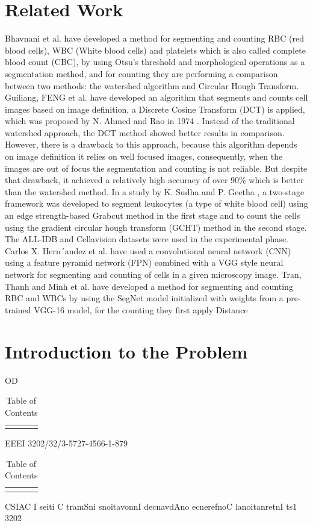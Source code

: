\documentclass[conference]{IEEEtran}
\begin{document}
\section{Related Work}
Bhavnani et al. \cite{ref2} have developed a method for segmenting and counting RBC (red blood cells), WBC (White blood cells) and platelets which is also called complete blood count (CBC), by using Otsu’s threshold and morphological operations as a segmentation method, and for counting they are performing a comparison between two methods: the watershed algorithm and Circular Hough Transform.
Guiliang, FENG et al. \cite{ref3} have developed an algorithm that segments and counts cell images based on image definition, a Discrete Cosine Transform (DCT) is applied, which was proposed by N. Ahmed and Rao in 1974 \cite{ref4}. Instead of the traditional watershed approach, the DCT method showed better results in comparison. However, there is a drawback to this approach, because this algorithm depends on image definition it relies on well focused images, consequently, when the images are out of focus the segmentation and counting is not reliable. But despite that drawback, it achieved a relatively high accuracy of over 90\% which is better than the watershed method. In a study by K. Sudha and P. Geetha \cite{ref5}, a two-stage framework was developed to segment leukocytes (a type of white blood cell) using an edge strength-based Grabcut method in the first stage and to count the cells using the gradient circular hough transform (GCHT) method in the second stage. The ALL-IDB \cite{ref6} and Cellavision \cite{ref7} datasets were used in the experimental phase.
Carlos X. Hern´andez et al. \cite{ref8} have used a convolutional neural network (CNN) using a feature pyramid network (FPN) combined with a VGG style neural network for segmenting and counting of cells in a given microscopy image.
Tran, Thanh and Minh et al. \cite{ref9} have developed a method for segmenting and counting RBC and WBCs by using the SegNet model initialized with weights from a pre-trained VGG-16 model, for the counting they first apply Distance

\section{Introduction to the Problem}
OD
\begin{table}[htbp]
\centering
\caption{Table of Contents}
\label{tab:label}
\begin{tabular}{lll}
\hline
 & & \\
\hline
 & & \\
\hline
\end{tabular}
\end{table}
EEEI
3202/32/3-5727-4566-1-879
\begin{table}[htbp]
\centering
\caption{Table of Contents}
\label{tab:label}
\begin{tabular}{lll}
\hline
 & & \\
\hline
 & & \\
\hline
\end{tabular}
\end{table}
CSIAC
I
seiti
C
tramSni
snoitavonnI
decnavdAno
ecnerefnoC
lanoitanretnI
ts1
3202
\end{document}
